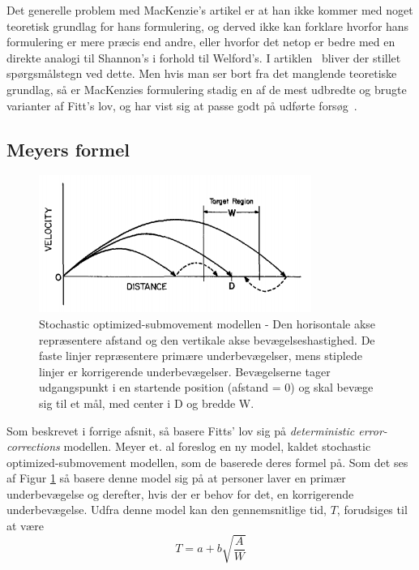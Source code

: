 Det generelle problem med MacKenzie's artikel er at han ikke kommer med noget teoretisk grundlag for hans formulering, og derved ikke kan forklare hvorfor hans formulering er mere præcis end andre, eller hvorfor det netop er bedre med en direkte analogi til Shannon's i forhold til Welford's. I artiklen~\cite{drewes2010} bliver der stillet spørgsmålstegn ved dette. Men hvis man ser bort fra det manglende teoretiske grundlag, så er MacKenzies formulering stadig en af de mest udbredte og brugte varianter af Fitt's lov, og har vist sig at passe godt på udførte forsøg~\cite{goldberg2015}.

\subsection*{Meyers formel}
\begin{figure}[h]
\centering
\includegraphics[scale=1.0]{images/illustrations/base_model_meyer}
\caption{Stochastic optimized-submovement modellen - Den horisontale akse repræsentere afstand og den vertikale akse bevægelseshastighed. De faste linjer repræsentere primære underbevægelser, mens stiplede linjer er korrigerende underbevægelser. Bevægelserne tager udgangspunkt i en startende position (afstand = 0) og skal bevæge sig til et mål, med center i D og bredde W.}
\label{fig:MeyerTheory}
\end{figure}
Som beskrevet i forrige afsnit, så basere Fitts' lov sig på \emph{deterministic error-corrections} modellen. Meyer et. al foreslog en ny model, kaldet stochastic optimized-submovement modellen, som de baserede deres formel på\cite{meyer1988}. Som det ses af Figur \ref{fig:MeyerTheory} så basere denne model sig på at personer laver en primær underbevægelse og derefter, hvis der er behov for det, en korrigerende underbevægelse. Udfra denne model kan den gennemsnitlige tid, $T$, forudsiges til at være
\begin{equation}
\label{eq:meyer}
T = a + b \sqrt{\frac{A}{W}}
\end{equation}

